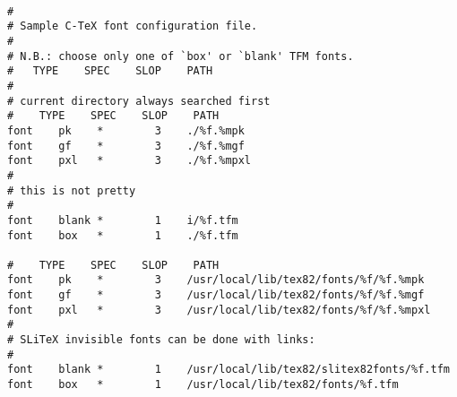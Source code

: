 {\tt
\begin{verbatim}
#
# Sample C-TeX font configuration file.
#
# N.B.: choose only one of `box' or `blank' TFM fonts.
#	TYPE	SPEC	SLOP	PATH
#
# current directory always searched first
#    TYPE    SPEC    SLOP    PATH
font    pk    *        3    ./%f.%mpk
font    gf    *        3    ./%f.%mgf
font    pxl   *        3    ./%f.%mpxl
#
# this is not pretty
#
font    blank *        1    i/%f.tfm
font    box   *        1    ./%f.tfm

#    TYPE    SPEC    SLOP    PATH
font    pk    *        3    /usr/local/lib/tex82/fonts/%f/%f.%mpk
font    gf    *        3    /usr/local/lib/tex82/fonts/%f/%f.%mgf
font    pxl   *        3    /usr/local/lib/tex82/fonts/%f/%f.%mpxl
#
# SLiTeX invisible fonts can be done with links:
#
font    blank *        1    /usr/local/lib/tex82/slitex82fonts/%f.tfm
font    box   *        1    /usr/local/lib/tex82/fonts/%f.tfm
\end{verbatim}
}
